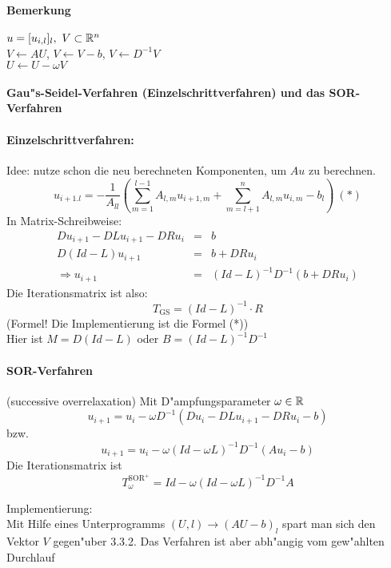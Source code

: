 \documentclass{scrartcl}
\begin{document}
\paragraph*{Bemerkung}
$u = [ u_{i,l} ]_l, \ V \subset \mathbb{R}^n$ \\
$V \leftarrow AU$, $V \leftarrow V - b$, $V \leftarrow D^{-1}V$ \\
$U \leftarrow U - \omega V$

\paragraph{Gau"s-Seidel-Verfahren (Einzelschrittverfahren) und das SOR-Verfahren} 

\paragraph*{Einzelschrittverfahren:}
Idee: nutze schon die neu berechneten Komponenten, um $Au$ zu berechnen. 
$$u_{i+1.l} = -\frac{1}{A_{ll}} \left( \sum\limits_{m=1}^{l-1} A_{l,m} u_{i+1, m} + \sum\limits_{m=l+1}^n A_{l,m} u_{i,m} - b_l\right) \ (*)$$
In Matrix-Schreibweise:
\begin{eqnarray*}
D u_{i+1} - DL u_{i+1} - DR u_i & = & b \\
D( Id - L) u_{i+1} & = & b + DR u_i \\
\Rightarrow u_{i+1} & = & (Id - L)^{-1} D^{-1} (b + DR u_i)
\end{eqnarray*}
Die Iterationsmatrix ist also:
$$T_\mathrm{GS} = (Id - L)^{-1}\cdot R$$
(Formel! Die Implementierung ist die Formel (*)) \\
Hier ist $M = D(Id- L)$ oder $B = (Id-L)^{-1}D^{-1}$

\paragraph*{SOR-Verfahren} (successive overrelaxation)
Mit D"ampfungsparameter $\omega \in \mathbb{R}$
$$ u_{i+1} = u_i - \omega D^{-1} ( D u_i - DL u_{i+1} - DR u_i - b)$$
bzw.
$$ u_{i+1} = u_i - \omega(Id - \omega L) ^{-1} D^{-1} (A u_i - b)$$
Die Iterationsmatrix ist
$$T_\omega^{\mathrm{SOR}^+} = Id - \omega(Id - \omega L)^{-1} D^{-1} A$$


Implementierung: \\
Mit Hilfe eines Unterprogramms $(U, l) \rightarrow (AU - b)_l$ spart man sich den Vektor $V$ gegen"uber 3.3.2. Das Verfahren ist aber abh"angig vom gew"ahlten Durchlauf
\end{document}
